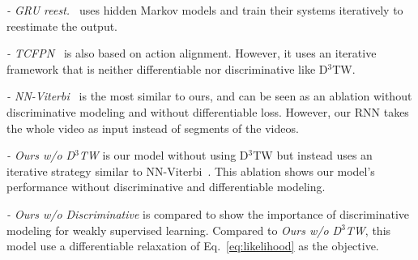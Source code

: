 \documentclass[10pt,twocolumn,letterpaper]{article}
\newcommand{\dttw}{D${}^3$TW\xspace}
\newcommand{\eqnref}[1]{{Eq.\ \eqref{eq:#1}}}
\begin{document}
{\noindent \it  - GRU reest.~\cite{richard2017weakly}}  uses hidden Markov models and train their systems iteratively to reestimate the output. 

{\noindent \it  - TCFPN~\cite{ding2018weakly}}  is also based on action alignment. However, it uses an iterative framework that is neither differentiable nor discriminative like \dttw.

{\noindent \it  - NN-Viterbi~\cite{richard2018neuralnetwork}} is the most similar to ours, and can be seen as an ablation without discriminative modeling and without differentiable loss. However, our RNN takes the whole video as input instead of segments of the videos.

{\noindent \it  - Ours w/o \dttw} is our model without using \dttw but instead uses an iterative strategy similar to NN-Viterbi~\cite{richard2018neuralnetwork}. This ablation shows our model's performance without discriminative and differentiable modeling.

{\noindent \it  - Ours w/o Discriminative} is compared to show the importance of discriminative modeling for weakly supervised learning. Compared to \emph{Ours w/o \dttw}, this model use a differentiable relaxation of \eqnref{likelihood} as the objective. 
\end{document}
